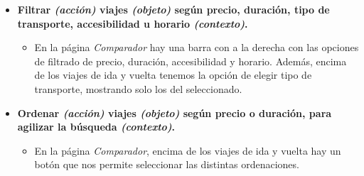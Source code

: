 \begin{itemize}
    \item \textbf{Filtrar \textit{(acción)} viajes \textit{(objeto)} según precio, duración, tipo de transporte, accesibilidad u horario \textit{(contexto)}.}
        \begin{itemize}
            \item En la página \textit{Comparador} hay una barra con a la derecha con las opciones de filtrado de precio, duración, accesibilidad y horario. Además, encima de los viajes
                de ida y vuelta tenemos la opción de elegir tipo de transporte, mostrando solo los del seleccionado.
        \end{itemize}

    \item \textbf{Ordenar \textit{(acción)} viajes \textit{(objeto)} según precio o duración, para agilizar la búsqueda \textit{(contexto)}.}
        \begin{itemize}
            \item En la página \textit{Comparador}, encima de los viajes de ida y vuelta hay un botón que nos permite seleccionar las distintas ordenaciones.
        \end{itemize}
\end{itemize}